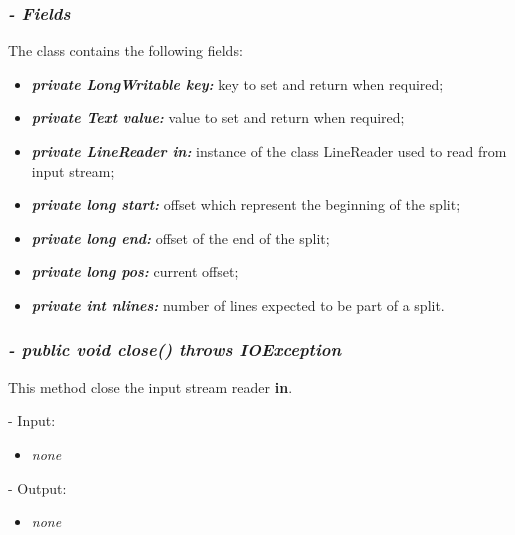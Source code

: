 \documentclass[]{report}
\begin{document}
	\subsubsection*{\textit{\textbf{-} Fields}} 
	The class contains the following fields:
	\begin{itemize}
		\item \textit{\textbf{private LongWritable key:}} key to set and return when required;
		\item \textit{\textbf{private Text value:}} value to set and return when required;
		\item \textit{\textbf{private LineReader in:}} instance of the class LineReader used to read from input stream; 
		\item \textit{\textbf{private long start:}} offset which represent the beginning of the split;
		\item \textit{\textbf{private long end:}} offset of the end of the split;
		\item \textit{\textbf{private long pos:}} current offset;
		\item \textit{\textbf{private int nlines:}} number of lines expected to be part of a split.	
	\end{itemize}

	\subsubsection*{\textit{\textbf{-} public void close() throws IOException}}   	
	This method close the input stream reader \textbf{in}.    
	\begin{description}
		\item - Input:
		\begin{itemize}
			\item \textit{none}
		\end{itemize}
	\end{description}	
	\begin{description}
		\item - Output:
		\begin{itemize}
			\item \textit{none} 
		\end{itemize}
	\end{description}
\end{document}
